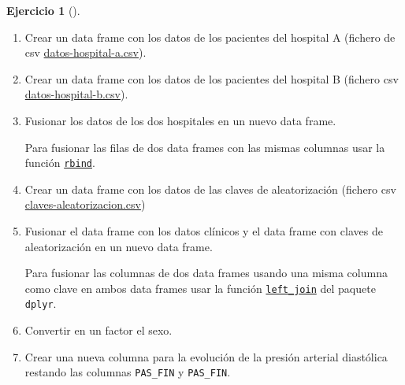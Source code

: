 \documentclass[
  a4paper,
]{scrreport}
\theoremstyle{definition}
\newtheorem{exercise}{Ejercicio}[chapter]
\theoremstyle{remark}
\begin{document}
\begin{exercise}[]
\begin{enumerate}
\def\labelenumi{\alph{enumi}.}
\item
  Crear un data frame con los datos de los pacientes del hospital A
  (fichero de csv
  \href{datos/hipertension/datos-hospital-a.csv}{datos-hospital-a.csv}).
\item
  Crear un data frame con los datos de los pacientes del hospital B
  (fichero csv
  \href{datos/hipertension/datos-hospital-b.csv}{datos-hospital-b.csv}).
\item
  Fusionar los datos de los dos hospitales en un nuevo data frame.

  \begin{tcolorbox}[enhanced jigsaw, coltitle=black, left=2mm, colback=white, leftrule=.75mm, toptitle=1mm, breakable, bottomrule=.15mm, titlerule=0mm, bottomtitle=1mm, title=\textcolor{quarto-callout-note-color}{\faInfo}\hspace{0.5em}{Ayuda}, arc=.35mm, toprule=.15mm, rightrule=.15mm, colframe=quarto-callout-note-color-frame, opacityback=0, colbacktitle=quarto-callout-note-color!10!white, opacitybacktitle=0.6]

  Para fusionar las filas de dos data frames con las mismas columnas
  usar la función
  \href{https://aprendeconalf.es/manual-r/03-tipos-datos-estructurados.html\#a\%C3\%B1adir-elementos-a-un-data-frame}{\texttt{rbind}}.

  \end{tcolorbox}
\item
  Crear un data frame con los datos de las claves de aleatorización
  (fichero csv
  \href{datos/hipertension/claves-aleatorizacion.csv}{claves-aleatorizacion.csv})
\item
  Fusionar el data frame con los datos clínicos y el data frame con
  claves de aleatorización en un nuevo data frame.

  \begin{tcolorbox}[enhanced jigsaw, coltitle=black, left=2mm, colback=white, leftrule=.75mm, toptitle=1mm, breakable, bottomrule=.15mm, titlerule=0mm, bottomtitle=1mm, title=\textcolor{quarto-callout-note-color}{\faInfo}\hspace{0.5em}{Ayuda}, arc=.35mm, toprule=.15mm, rightrule=.15mm, colframe=quarto-callout-note-color-frame, opacityback=0, colbacktitle=quarto-callout-note-color!10!white, opacitybacktitle=0.6]

  Para fusionar las columnas de dos data frames usando una misma columna
  como clave en ambos data frames usar la función
  \href{https://dtplyr.tidyverse.org/reference/left_join.dtplyr_step.html}{\texttt{left\_join}}
  del paquete \texttt{dplyr}.

  \end{tcolorbox}
\item
  Convertir en un factor el sexo.
\item
  Crear una nueva columna para la evolución de la presión arterial
  diastólica restando las columnas \texttt{PAS\_FIN} y
  \texttt{PAS\_FIN}.
\end{enumerate}

\end{exercise}
\end{document}
